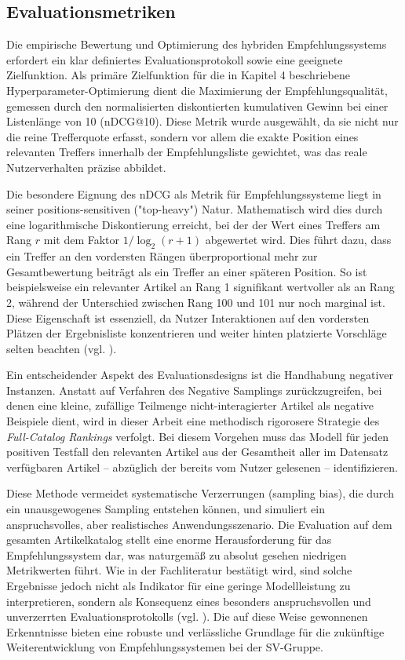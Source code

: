 \subsection{Evaluationsmetriken}
\label{sec:metrics}
Die empirische Bewertung und Optimierung des hybriden Empfehlungssystems erfordert ein klar definiertes 
Evaluationsprotokoll sowie eine geeignete Zielfunktion. Als primäre Zielfunktion für die in Kapitel 4 
beschriebene Hyperparameter-Optimierung dient die Maximierung der Empfehlungsqualität, gemessen durch 
den normalisierten diskontierten kumulativen Gewinn bei einer Listenlänge von 10 (nDCG@10). Diese Metrik 
wurde ausgewählt, da sie nicht nur die reine Trefferquote erfasst, sondern vor allem die exakte Position 
eines relevanten Treffers innerhalb der Empfehlungsliste gewichtet, was das reale Nutzerverhalten präzise abbildet.

Die besondere Eignung des nDCG als Metrik für Empfehlungssysteme liegt in seiner positions-sensitiven 
("top-heavy") Natur. Mathematisch wird dies durch eine logarithmische Diskontierung erreicht, bei der der 
Wert eines Treffers am Rang $r$ mit dem Faktor $1/\log_2(r+1)$ abgewertet wird. Dies führt dazu, dass ein 
Treffer an den vordersten Rängen überproportional mehr zur Gesamtbewertung beiträgt als ein Treffer an einer 
späteren Position. So ist beispielsweise ein relevanter Artikel an Rang 1 signifikant wertvoller als 
an Rang 2, während der Unterschied zwischen Rang 100 und 101 nur noch marginal ist. Diese Eigenschaft ist 
essenziell, da Nutzer Interaktionen auf den vordersten Plätzen der Ergebnisliste konzentrieren und weiter 
hinten platzierte Vorschläge selten beachten (vgl. \cite{krichene_sampled_2020}).

Ein entscheidender Aspekt des Evaluationsdesigns ist die Handhabung negativer Instanzen. Anstatt auf 
Verfahren des Negative Samplings zurückzugreifen, bei denen eine kleine, zufällige Teilmenge 
nicht-interagierter Artikel als negative Beispiele dient, wird in dieser Arbeit eine 
methodisch rigorosere Strategie des \textit{Full-Catalog Rankings} verfolgt. Bei diesem Vorgehen muss 
das Modell für jeden positiven Testfall den relevanten Artikel aus der Gesamtheit aller im 
Datensatz verfügbaren Artikel – abzüglich der bereits vom Nutzer gelesenen – identifizieren.

Diese Methode vermeidet systematische Verzerrungen (sampling bias), die durch ein 
unausgewogenes Sampling entstehen können, und simuliert ein anspruchsvolles, aber realistisches 
Anwendungsszenario. Die Evaluation auf dem gesamten Artikelkatalog stellt eine enorme 
Herausforderung für das Empfehlungssystem dar, was naturgemäß zu absolut gesehen niedrigen 
Metrikwerten führt. Wie in der Fachliteratur bestätigt wird, sind solche Ergebnisse jedoch nicht 
als Indikator für eine geringe Modellleistung zu interpretieren, sondern als Konsequenz eines 
besonders anspruchsvollen und unverzerrten Evaluationsprotokolls 
(vgl. \cite{krichene_sampled_2020}). Die auf diese Weise gewonnenen Erkenntnisse bieten eine 
robuste und verlässliche Grundlage für die zukünftige Weiterentwicklung von 
Empfehlungssystemen bei der SV-Gruppe.

